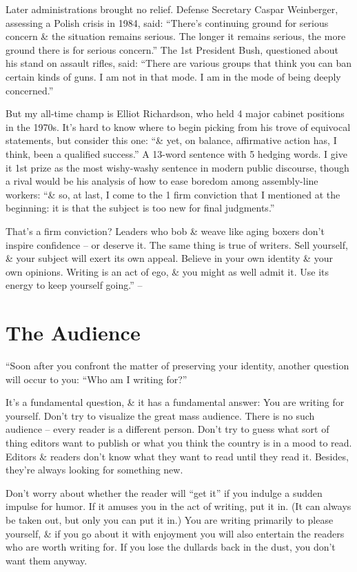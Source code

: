 \documentclass{article}
\begin{document}
Later administrations brought no relief. Defense Secretary Caspar Weinberger, assessing a Polish crisis in 1984, said: ``There's continuing ground for serious concern \& the situation remains serious. The longer it remains serious, the more ground there is for serious concern.'' The 1st President Bush, questioned about his stand on assault rifles, said: ``There are various groups that think you can ban certain kinds of guns. I am not in that mode. I am in the mode of being deeply concerned.''

But my all-time champ is Elliot Richardson, who held 4 major cabinet positions in the 1970s. It's hard to know where to begin picking from his trove of equivocal statements, but consider this one: ``\& yet, on balance, affirmative action has, I think, been a qualified success.'' A 13-word sentence with 5 hedging words. I give it 1st prize as the most wishy-washy sentence in modern public discourse, though a rival would be his analysis of how to ease boredom among assembly-line workers: ``\& so, at last, I come to the 1 firm conviction that I mentioned at the beginning: it is that the subject is too new for final judgments.''

That's a firm conviction? Leaders who bob \& weave like aging boxers don't inspire confidence -- or deserve it. The same thing is true of writers. Sell yourself, \& your subject will exert its own appeal. Believe in your own identity \& your own opinions. Writing is an act of ego, \& you might as well admit it. Use its energy to keep yourself going.'' -- \cite[pp. 24--28]{Zinsser2016}


\section{The Audience}
``Soon after you confront the matter of preserving your identity, another question will occur to you: ``Who am I writing for?''

It's a fundamental question, \& it has a fundamental answer: You are writing for yourself. Don't try to visualize the great mass audience. There is no such audience -- every reader is a different person. Don't try to guess what sort of thing editors want to publish or what you think the country is in a mood to read. Editors \& readers don't know what they want to read until they read it. Besides, they're always looking for something new.

Don't worry about whether the reader will ``get it'' if you indulge a sudden impulse for humor. If it amuses you in the act of writing, put it in. (It can always be taken out, but only you can put it in.) You are writing primarily to please yourself, \& if you go about it with enjoyment you will also entertain the readers who are worth writing for. If you lose the dullards back in the dust, you don't want them anyway.
\end{document}
